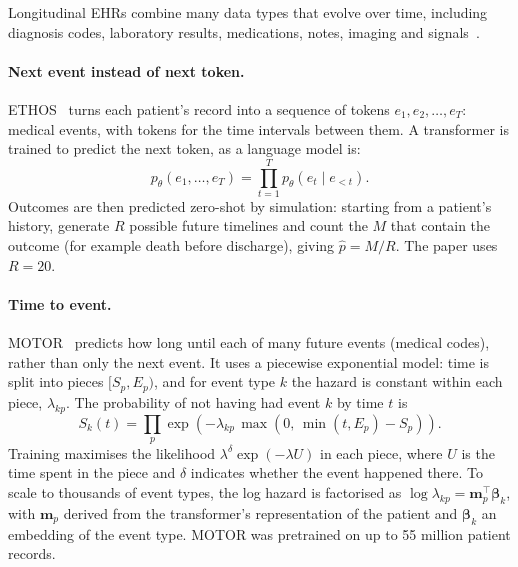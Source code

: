 Longitudinal EHRs combine many data types that evolve over time, including
diagnosis codes, laboratory results, medications, notes, imaging and
signals~\cite{fries2025foundation}.

\paragraph{Next event instead of next token.} ETHOS~\cite{renc2024zero} turns each
patient's record into a sequence of tokens $e_1, e_2, \dots, e_T$: medical events,
with tokens for the time intervals between them. A transformer is trained to
predict the next token, as a language model is:
\begin{equation}
  p_\theta(e_1, \dots, e_T) = \prod_{t=1}^{T} p_\theta(e_t \mid e_{<t}).
\end{equation}
Outcomes are then predicted zero-shot by simulation: starting from a patient's
history, generate $R$ possible future timelines and count the $M$ that contain
the outcome (for example death before discharge), giving $\hat{p} = M / R$.
The paper uses $R = 20$.

\paragraph{Time to event.} MOTOR~\cite{steinberg2024motor} predicts how long until
each of many future events (medical codes), rather than only the next event.
It uses a piecewise exponential model: time is split into pieces
$[S_p, E_p)$, and for event type $k$ the hazard is constant within each piece,
$\lambda_{kp}$. The probability of not having had event $k$ by time $t$ is
\begin{equation}
  S_k(t) = \prod_{p} \exp\left(-\lambda_{kp} \, \max\left(0,\, \min(t, E_p) - S_p\right)\right).
\end{equation}
Training maximises the likelihood $\lambda^{\delta} \exp(-\lambda U)$ in each
piece, where $U$ is the time spent in the piece and $\delta$ indicates whether
the event happened there. To scale to thousands of event types, the log hazard
is factorised as $\log \lambda_{kp} = \mathbf{m}_p^\top \symbf{\beta}_k$,
with $\mathbf{m}_p$ derived from the transformer's representation of the patient
and $\symbf{\beta}_k$ an embedding of the event type. MOTOR was pretrained
on up to 55 million patient records.

